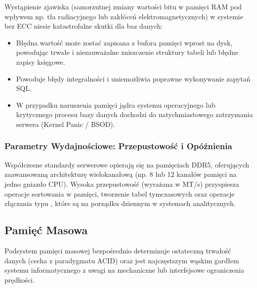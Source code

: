 \documentclass[letterpaper,10pt,polish]{sphinxmanual}
\begin{document}
\sphinxAtStartPar
Wystąpienie zjawiska  (samorzutnej zmiany wartości bitu w pamięci RAM pod wpływem np. tła radiacyjnego lub zakłóceń elektromagnetycznych) w systemie bez ECC niesie katastrofalne skutki dla baz danych:
\begin{itemize}
\item {} 
\sphinxAtStartPar
{} Błędna wartość może zostać zapisana z bufora pamięci wprost na dysk, powodując trwałe i niezauważalne zniszczenie struktury tabeli lub błędne zapisy księgowe.

\item {} 
\sphinxAtStartPar
{} Powoduje błędy integralności i uniemożliwia poprawne wykonywanie zapytań SQL.

\item {} 
\sphinxAtStartPar
{} W przypadku naruszenia pamięci jądra systemu operacyjnego lub krytycznego procesu bazy danych dochodzi do natychmiastowego zatrzymania serwera (Kernel Panic / BSOD).

\end{itemize}


\subsubsection{Parametry Wydajnościowe: Przepustowość i Opóźnienia}
\label{\detokenize{rozdzia_u0142_2/rozdzia_u0142_21/index:parametry-wydajnosciowe-przepustowosc-i-opoznienia}}
\sphinxAtStartPar
Współczesne standardy serwerowe opierają się na pamięciach DDR5, oferujących zaawansowaną architekturę wielokanałową (np. 8 lub 12 kanałów pamięci na jedno gniazdo CPU). Wysoka przepustowość (wyrażana w MT/s) przyspiesza operacje sortowania w pamięci, tworzenie tabel tymczasowych oraz operacje złączania typu , które są na porządku dziennym w systemach analitycznych.


\subsection{Pamięć Masowa}
\label{\detokenize{rozdzia_u0142_2/rozdzia_u0142_21/index:pamiec-masowa}}
\sphinxAtStartPar
Podsystem pamięci masowej bezpośrednio determinuje ostateczną trwałość danych (cecha  z paradygmatu ACID) oraz jest najczęstszym wąskim gardłem systemu informatycznego z uwagi na mechaniczne lub interfejsowe ograniczenia prędkości.
\end{document}

